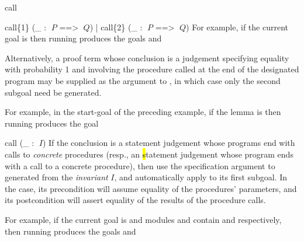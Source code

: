 \begin{tactic}{call}
\begin{tsyntax}{call\{1\} (_ : $\;P$ ==> $\;Q$) | call\{2\} (_ : $\;P$ ==> $\;Q$)}
  For example, if the current goal is
  then running
   produces the
  goals  and

  \bigskip Alternatively, a proof term whose conclusion is a \phl
  judgement specifying equality with probability 1 and involving the
  procedure called at the end of the designated program may be
  supplied as the argument to , in which case only the second
  subgoal need be generated.

  \medskip
  For example, in the start-goal of the preceding example,
  if the lemma  is
  then running
   produces the
  goal 
  \end{tsyntax}

  \begin{tsyntax}{call (_ : $\;I$)}
    If the conclusion is a \prhl statement judgement whose programs
    end with calls to \emph{concrete} procedures (resp., an \hl
    statement judgement whose program ends with a call to a concrete
    procedure), then use the specification argument to 
    generated from the \emph{invariant} $I$, and automatically apply
     to its first subgoal.  In the \prhl case, its
    precondition will assume equality of the procedures' parameters,
    and its postcondition will assert equality of the results of the
    procedure calls.

    \medskip
    For example, if the current goal is
    and modules  and  contain
     and
    respectively, then
    running 
    produces the goals
     and
  \end{tsyntax}


\end{tactic}
